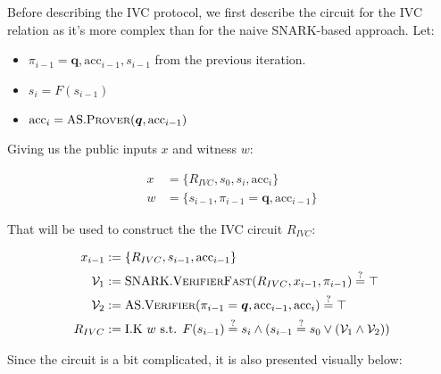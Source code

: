 \documentclass[
]{article}
\providecommand{\tightlist}{%
  \setlength{\itemsep}{0pt}\setlength{\parskip}{0pt}}
\newcommand*\Vc{\mathcal{V}}
\newcommand*\meq{\stackrel{?}{=}}
\renewcommand{\vec}[1]{ \boldsymbol{#1} }
\newcommand*{\acc}{\mathrm{acc}}
\newcommand*{\Prover}{\mathrm{\text{P\scriptsize ROVER}}}
\newcommand*{\Verifier}{\mathrm{\text{V\scriptsize ERIFIER}}}
\newcommand*{\SNARKVerifierFast}{\mathrm{\text{SNARK}}.\mathrm{\text{V\scriptsize ERIFIER}\text{F\scriptsize AST}}}
\newcommand*{\AS}{\text{AS}}
\newcommand*{\ASProver}{\AS.\Prover}
\newcommand*{\ASVerifier}{\AS.\Verifier}
\begin{document}
Before describing the IVC protocol, we first describe the circuit for
the IVC relation as it's more complex than for the naive SNARK-based
approach. Let:

\begin{itemize}
\tightlist
\item
  \(\pi_{i-1} = \vec{q}, \acc_{i-1}, s_{i-1}\) from the previous
  iteration.
\item
  \(s_i = F(s_{i-1})\)
\item
  \(\acc_i = \ASProver(\vec{q}, \acc_{i-1})\)
\end{itemize}

Giving us the public inputs \(x\) and witness \(w\):

\[
\begin{aligned}
  x &= \{ R_{IVC}, s_0, s_i, \acc_i \}\\
  w &= \{ s_{i-1}, \pi_{i-1} = \vec{q}, \acc_{i-1} \}
\end{aligned}
\]

That will be used to construct the the IVC circuit \(R_{IVC}\):

\[
\begin{aligned}
  x_{i-1} &:= \{ R_{IVC}, s_{i-1}, \acc_{i-1} \} \\
  \Vc_1   &:= \SNARKVerifierFast(R_{IVC}, x_{i-1}, \pi_{i-1}) \meq \top \\
  \Vc_2   &:= \ASVerifier(\pi_{i-1} = \vec{q}, \acc_{i-1}, \acc_i) \meq \top \\
  R_{IVC} &:= \text{I.K } w \text{ s.t. } F(s_{i-1}) \meq s_i \land (s_{i-1} \meq s_0 \lor ( \Vc_1 \land \Vc_2 ) ) \\
\end{aligned}
\]

Since the circuit is a bit complicated, it is also presented visually
below:
\end{document}
